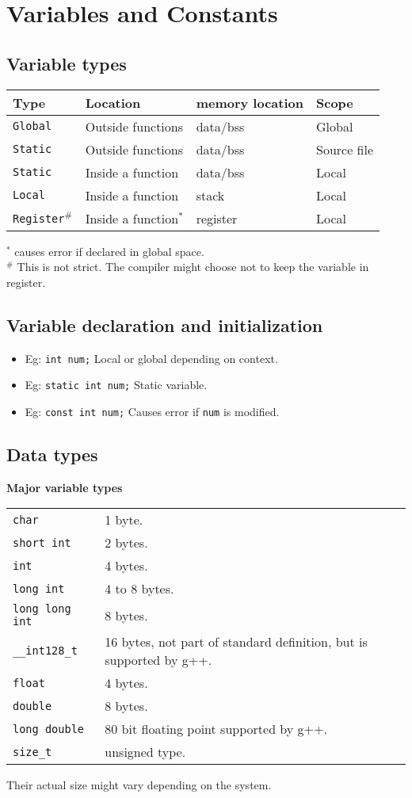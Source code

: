 \section{Variables and Constants}

\subsection{Variable types}
\begin{tabularx}{\linewidth}{lllX}
Type & Location & memory location & Scope\\
\hline
\texttt{Global} & Outside functions & data/bss & Global\\
\texttt{Static} & Outside functions & data/bss & Source file\\
\texttt{Static} & Inside a function & data/bss & Local\\
\texttt{Local} & Inside a function & stack & Local\\
\texttt{Register$^\#$} & Inside a function$^*$ & register & Local\\
\hline
\end{tabularx}
$^*$ causes error if declared in global space.\\
$^\#$ This is not strict. The compiler might choose not to keep the variable in register.

\subsection{Variable declaration and initialization}
\begin{itemize}
\item Eg: \texttt{int num;}
Local or global depending on context.
\item Eg: \texttt{static int num;}
Static variable.
\item Eg: \texttt{const int num;}
Causes error if \texttt{num} is modified.
\end{itemize}
\subsection{Data types}
\textbf{Major variable types}
\begin{tabularx}{\linewidth}{lX}
\texttt{char} & 1 byte.\\
\texttt{short int} & 2 bytes.\\
\texttt{int} & 4 bytes.\\
\texttt{long int} & 4 to 8 bytes.\\
\texttt{long long int} & 8 bytes.\\
\texttt{\_\_int128\_t} & 16 bytes, not part of standard definition, but is supported by g++.\\ 
\texttt{float} & 4 bytes.\\
\texttt{double} & 8 bytes.\\
\texttt{long double} & 80 bit floating point supported by g++.\\
\texttt{size\_t} & unsigned type.\\
\end{tabularx}
Their actual size might vary depending on the system.\\


